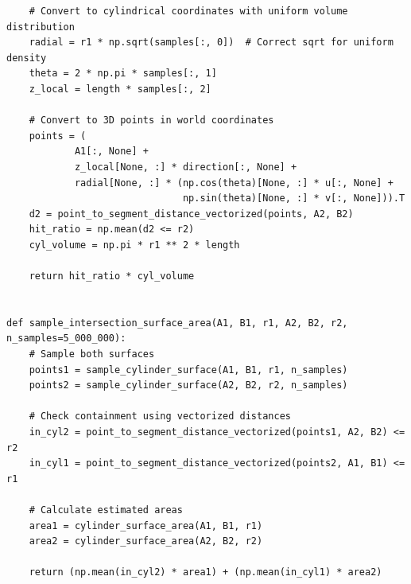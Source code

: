 \documentclass[authoryear]{elsarticle}
\begin{document}
\begin{lstlisting}
    # Convert to cylindrical coordinates with uniform volume distribution
    radial = r1 * np.sqrt(samples[:, 0])  # Correct sqrt for uniform density
    theta = 2 * np.pi * samples[:, 1]
    z_local = length * samples[:, 2]

    # Convert to 3D points in world coordinates
    points = (
            A1[:, None] +
            z_local[None, :] * direction[:, None] +
            radial[None, :] * (np.cos(theta)[None, :] * u[:, None] +
                               np.sin(theta)[None, :] * v[:, None])).T
    d2 = point_to_segment_distance_vectorized(points, A2, B2)
    hit_ratio = np.mean(d2 <= r2)
    cyl_volume = np.pi * r1 ** 2 * length

    return hit_ratio * cyl_volume


def sample_intersection_surface_area(A1, B1, r1, A2, B2, r2, n_samples=5_000_000):
    # Sample both surfaces
    points1 = sample_cylinder_surface(A1, B1, r1, n_samples)
    points2 = sample_cylinder_surface(A2, B2, r2, n_samples)

    # Check containment using vectorized distances
    in_cyl2 = point_to_segment_distance_vectorized(points1, A2, B2) <= r2
    in_cyl1 = point_to_segment_distance_vectorized(points2, A1, B1) <= r1

    # Calculate estimated areas
    area1 = cylinder_surface_area(A1, B1, r1)
    area2 = cylinder_surface_area(A2, B2, r2)

    return (np.mean(in_cyl2) * area1) + (np.mean(in_cyl1) * area2)

\end{lstlisting}
\end{document}
